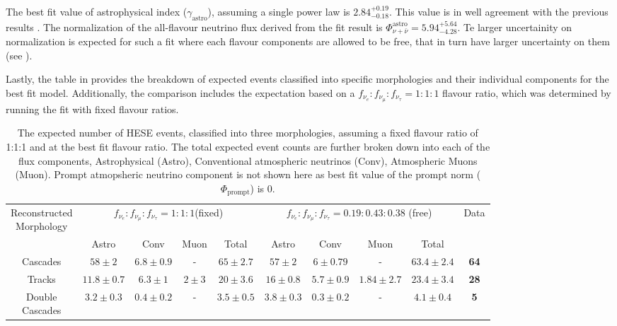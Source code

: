 The best fit value of astrophysical index ($\gamma_{\mathrm{astro}}$), assuming a single power law is $2.84_{-0.18}^{+0.19}$. This value is in well agreement with the previous results . The  normalization of the all-flavour neutrino flux derived from the fit result is $\Phi_{\nu+\bar\nu}^{\mathrm{astro}} = 5.94_{-4.28}^{+5.64}$. Te larger uncertainity on normalization is expected for such a fit where each flavour components are allowed to be free, that in turn have larger uncertainty on them (see ). 

Lastly, the table in  provides the breakdown of expected events classified into specific morphologies and their individual components for the best fit model. Additionally, the comparison includes the expectation based on a $f_{\nu_e}:f_{\nu_{\mu}}:f_{\nu_{\tau}} = 1:1:1$ flavour ratio, which was determined by running the fit with fixed flavour ratios.

\begin{table}[h]
    \caption[The expected number of HESE events in 12 years at the best fit value]{The expected number of HESE events, classified into three morphologies, assuming a fixed flavour ratio of 1:1:1 and at the best fit flavour ratio. The total expected event counts are further broken down into each of the flux components, Astrophysical (Astro), Conventional atmospheric neutrinos (Conv), Atmospheric Muons (Muon). Prompt atmopsheric neutrino component is not shown here as best fit value of the prompt norm ($\Phi_{\mathrm{prompt}}$) is 0.}
    
    \begin{tabular}{ c| c c c c |c c c c|c}
        
        \hline
        \makecell{Reconstructed \\ Morphology} & \multicolumn{4}{c|}{$f_{\nu_e}:f_{\nu_{\mu}}:f_{\nu_{\tau}} = 1:1:1$(fixed)}  & \multicolumn{4}{c|}{$f_{\nu_e}:f_{\nu_{\mu}}:f_{\nu_{\tau}} = 0.19:0.43:0.38$ (free)} & Data\\
         &Astro&Conv&Muon&Total&Astro&Conv&Muon&Total& \\
        \hline
        \hline
        Cascades&$58\pm2$&$6.8\pm0.9$&-&\textbf{$65\pm2.7$}&$57\pm2$&$6\pm0.79$&-&\textbf{$63.4\pm2.4$}&\textbf{64}\\
        Tracks&$11.8\pm0.7$&$6.3\pm1$&$2\pm3$&\textbf{$20\pm3.6$}&$16\pm0.8$&$5.7\pm0.9$&$1.84\pm2.7$&\textbf{$23.4\pm3.4$}&\textbf{28}\\
        \makecell{Double \\ Cascades}&$3.2\pm0.3$&$0.4\pm0.2$&-&\textbf{$3.5\pm0.5$}&$3.8\pm0.3$&$0.3\pm0.2$&-&\textbf{$4.1\pm0.4$}&\textbf{5}\\
        \hline
        \hline
    \end{tabular}
    
\end{table}

